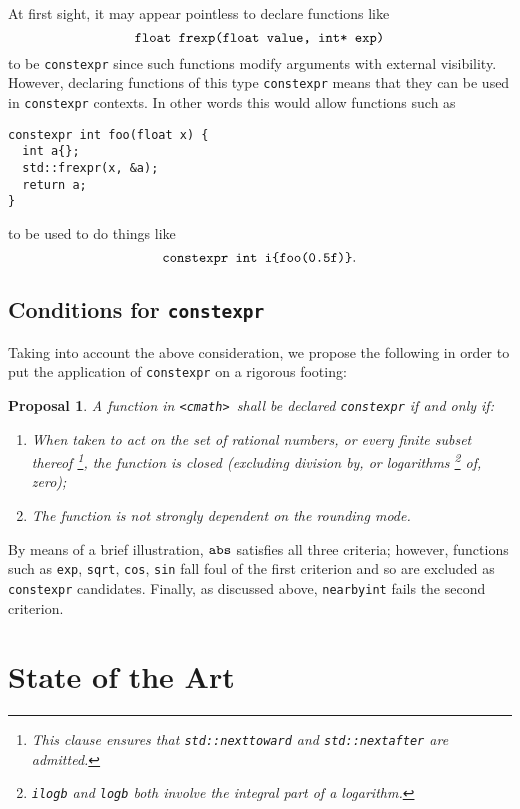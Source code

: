 \documentclass[prd,twocolumn,amsmath,amssymb,nofootinbib,eqsecnum]{revtex4-1}
\newcommand{\constexpr}{\code{constexpr}\xspace}
\newcommand{\code}[1]{{\tt #1}}
\newcommand{\header}[1]{{\tt <#1>}}
\newcommand{\cmath}{\header{cmath}}
\newtheorem*{proposal*}{Proposal}
\begin{document}
At first sight, it may appear pointless to declare functions like
\[
	\mbox{\code{float frexp(float value, int* exp)}}
\]
to be \constexpr since such functions modify arguments with external visibility.
However, declaring functions of this type \constexpr means that they can be used
in \constexpr contexts. In other words this would allow functions such as
\begin{Verbatim}
constexpr int foo(float x) {
  int a{};
  std::frexpr(x, &a);
  return a;
}
\end{Verbatim}	
to be used to do things like
\[
	\mbox{\code{constexpr int i\{foo(0.5f)\}}}.
\]


\subsection{Conditions for \constexpr}

Taking into account the above consideration, we propose the following in order to put
the application of \constexpr on a rigorous footing:
\begin{proposal*}
	A function in \cmath\ shall be declared \constexpr if and only if:
	\begin{enumerate}
		\item When taken to act on the set of rational numbers, or every finite subset thereof%
		\footnote{This clause ensures that \code{std::nexttoward} and \code{std::nextafter} are 
		admitted.},
		the function is closed (excluding division by, or logarithms%
		\footnote{\code{ilogb} and \code{logb} both involve the integral part of a logarithm.}
		of, zero);
		
		\item The function is not strongly dependent on the rounding mode.
	\end{enumerate}
\end{proposal*}

By means of a brief illustration, $\code{abs}$ satisfies all three criteria; however, functions such as 
\code{exp}, \code{sqrt}, \code{cos}, \code{sin} fall foul of the first criterion and so are excluded as 
\constexpr candidates. Finally, as discussed above, \code{nearbyint} fails the second criterion.


\section{State of the Art}
\end{document}

